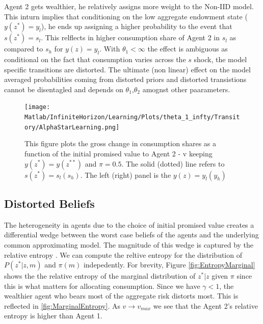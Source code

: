 \documentclass[12pt]{article}
\begin{document}
Agent 2 gets wealthier, he relatively assigns more weight to the Non-IID model. This inturn implies that conditioning on the low aggregate endowment state ($y(z^*)=y_l$), he ends up assigning a higher probability to the event that $s(z^*)=s_l$. This relflects in higher consumption share of Agent 2 in $s_l$ as compared to $s_h$ for $y(z)=y_l$. With $\theta_1 <\infty$ the effect is ambiguous as conditional on the fact that consumption varies across the $s$ shock, the model specific transitions are distorted. The ultimate (non linear) effect on the model averaged probabilities coming from distorted priors and distorted transistions cannot be disentagled and depends on $\theta_1$,$\theta_2$ amognst other paarameters.
\begin{figure}[htbp]
\centering
	  \texttt{[image: Matlab/InfiniteHorizon/Learning/Plots/theta\_1\_infty/Transitory/AlphaStarLearning.png]}

	\caption{ This figure plots the gross change in consumption shares as a function 
of the initial promised value to Agent 2 - v keeping $y(z^*)=y(z^{**})$ and $\pi=0.5$. The solid (dotted) line refers to
 $s(z^*)=s_l (s_h)$. The left (right) panel is the $y(z)=y_l(y_h)$}
	\label{fig:AlphaStarLearning}
\end{figure} 


\subsection{Distorted Beliefs}
The heterogeneity in agents due to the choice of initial promised value creates a differential wedge between the worst case beliefs of the agents and the underlying common approximating model. The magnitude of this wedge is captured by the relative entropy . We can compute the reltive entropy for the distribution of $P(z^{*}|z,m)$ and $\pi(m)$  indepedently. For brevity, Figure \ref{fig:EntropyMarginal} shows the the relative entropy of the marginal distribution of $z^{*}|z$ given $\pi$ since this is what matters for allocating consumption. Since we have $\gamma < 1$, the wealthier agent who bears most of the aggregate risk distorts most. This is reflected in \ref{fig:MarginalEntropy}. As $v \to v_{max}$ we see that the Agent 2's relative entropy is higher than Agent 1. 
\end{document}
